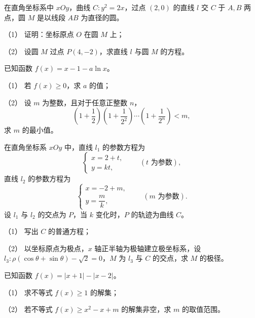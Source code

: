 \begin{question}
在直角坐标系中 \(xOy\)，曲线 \(C:y^2=2x\)，过点 \((2,0)\) 的直线 \(l\) 交 \(C\) 于 \(A,B\) 两点，圆 \(M\) 是以线段 \(AB\) 为直径的圆。

   （1） 证明：坐标原点 \(O\) 在圆 \(M\) 上；

   （2） 设圆 \(M\) 过点 \(P(4,-2)\)，求直线 \(l\) 与圆 \(M\) 的方程。

\end{question}
\begin{question}
已知函数 \(f(x)=x-1-a\ln x\)。

   （1） 若 \(f(x)\ge0\)，求 \(a\) 的值；

   （2） 设 \(m\) 为整数，且对于任意正整数 \(n\)，
\nopagebreak[4]
\[
   \left(1+\frac12\right)\left(1+\frac1{2^2}\right)\cdots\left(1+\frac1{2^n}\right)<m,
\]
   求 \(m\) 的最小值。

\end{question}
\begin{question}
在直角坐标系 \(xOy\) 中，直线 \(l_1\) 的参数方程为
\nopagebreak[4]
\[
\begin{cases}
x=2+t,\\
y=kt,
\end{cases}\qquad(t\text{ 为参数}),
\]
直线 \(l_2\) 的参数方程为
\nopagebreak[4]
\[
\begin{cases}
x=-2+m,\\
y=\dfrac{m}{k},
\end{cases}\qquad(m\text{ 为参数}).
\]
设 \(l_1\) 与 \(l_2\) 的交点为 \(P\)，当 \(k\) 变化时，\(P\) 的轨迹为曲线 \(C\)。

   （1） 写出 \(C\) 的普通方程；

   （2） 以坐标原点为极点，\(x\) 轴正半轴为极轴建立极坐标系，设 \(l_3:\rho(\cos\theta+\sin\theta)-\sqrt2=0\)，\(M\) 为 \(l_3\) 与 \(C\) 的交点，求 \(M\) 的极径。

\end{question}
\begin{question}
已知函数 \(f(x)=|x+1|-|x-2|\)。

   （1） 求不等式 \(f(x)\ge1\) 的解集；

   （2） 若不等式 \(f(x)\ge x^2-x+m\) 的解集非空，求 \(m\) 的取值范围。

\end{question}
